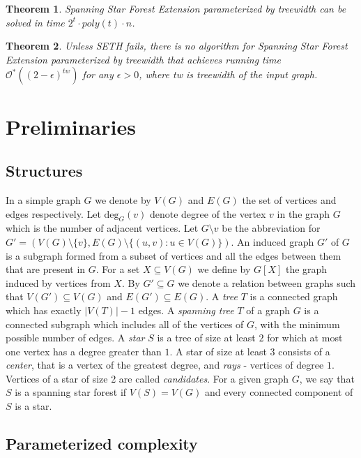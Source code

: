 \documentclass[en]{pracamgr}
\newtheorem{theorem}{Theorem}
\theoremstyle{definition}
\newcommand{\ssf}{spanning star forest}
\newcommand{\ssfep}{{\sc Spanning Star Forest Extension}}
\newcommand{\degree}[2]{\textrm{deg}_{#1}(#2)}
\begin{document}
\begin{theorem}\label{thm-ssfep-tw-time}
	\ssfep{} parameterized by treewidth can be solved in time $2^t\cdot poly(t)\cdot n$.
\end{theorem}

\begin{theorem}\label{thm-ssfep-tw-seth}
	Unless SETH fails, there is no algorithm for \ssfep{} parameterized by treewidth that achieves running time $\mathcal{O}^*((2-\epsilon)^{tw})$ for any $\epsilon > 0$, where \textup{\textrm{tw}} is treewidth of the input graph.
\end{theorem}

\chapter{Preliminaries}\label{sec2}

\section{Structures}

In a simple graph $G$ we denote by $V(G)$ and $E(G)$ the set of vertices and edges respectively. 
Let $\degree{G}{v}$ denote degree of the vertex $v$ in the graph $G$ which is the number of adjacent vertices. 
Let $G \setminus v$ be the abbreviation for $G'=(V(G) \setminus \{v\}, E(G) \setminus \{(u,v): u \in V(G)\})$. 
An induced graph $G'$ of $G$ is a subgraph formed from a subset of vertices and all the edges between them that are present in $G$. For a set $X \subseteq V(G)$ we define by $G[X]$ the graph induced by vertices from $X$. 
By $G' \subseteq G$ we denote a relation between graphs such that $V(G') \subseteq V(G)$ and $E(G') \subseteq E(G)$.
A \emph{tree} $T$ is a connected graph which has exactly $|V(T)|-1$ edges. 
A \emph{spanning tree} $T$ of a graph $G$ is a connected subgraph which includes all of the vertices of $G$, with the minimum possible number of edges.
A \emph{star} $S$ is a tree of size at least $2$ for which at most one vertex has a degree greater than $1$. 
A star of size at least $3$ consists of a \emph{center}, that is a vertex of the greatest degree, and \emph{rays} - vertices of degree $1$. 
Vertices of a star of size 2 are called \emph{candidates}.
For a given graph $G$, we say that $S$ is a \ssf{} if $V(S)=V(G)$ and every connected component of $S$ is a star.

\section{Parameterized complexity}
\end{document}
